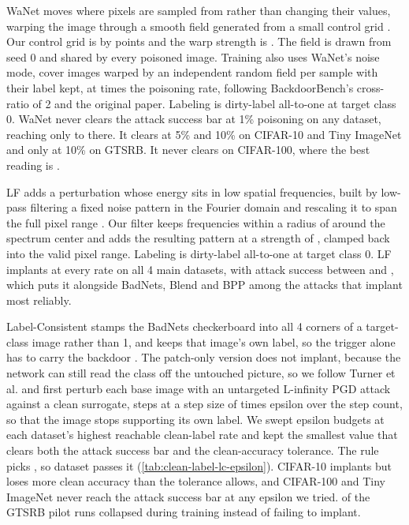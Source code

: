 WaNet moves where pixels are sampled from rather than changing their values, warping the image through a smooth field generated from a small control grid \cite{nguyen2021wanet}. Our control grid is \AttackWanetControlGridSize{} by \AttackWanetControlGridSize{} points and the warp strength is \AttackWanetStrength{}. The field is drawn from seed 0 and shared by every poisoned image. Training also uses WaNet's noise mode, cover images warped by an independent random field per sample with their label kept, at \AttackWanetCoverRatio{} times the poisoning rate, following BackdoorBench's cross-ratio of 2 and the original paper. Labeling is dirty-label all-to-one at target class 0. WaNet never clears the attack success bar at 1\% poisoning on any dataset, reaching only \AttackWanetAsrLowRateMin{} to \AttackWanetAsrLowRateMax{} there. It clears at 5\% and 10\% on CIFAR-10 and Tiny ImageNet and only at 10\% on GTSRB. It never clears on CIFAR-100, where the best reading is \AttackWanetAsrNeverClearingMax{}.

LF adds a perturbation whose energy sits in low spatial frequencies, built by low-pass filtering a fixed noise pattern in the Fourier domain and rescaling it to span the full pixel range \cite{zeng2021lf}. Our filter keeps frequencies within a radius of \AttackLfCutoff{} around the spectrum center and adds the resulting pattern at a strength of \AttackLfStrength{}, clamped back into the valid pixel range. Labeling is dirty-label all-to-one at target class 0. LF implants at every rate on all 4 main datasets, with attack success between \AttackLfAsrMin{} and \AttackLfAsrMax{}, which puts it alongside BadNets, Blend and BPP among the attacks that implant most reliably.

Label-Consistent stamps the BadNets checkerboard into all 4 corners of a target-class image rather than 1, and keeps that image's own label, so the trigger alone has to carry the backdoor \cite{turner2019label}. The patch-only version does not implant, because the network can still read the class off the untouched picture, so we follow Turner et al. and first perturb each base image with an untargeted L-infinity PGD attack \cite{madry2018pgd} against a clean surrogate, \AttackLcPgdSteps{} steps at a step size of \AttackLcPgdStepFactor{} times epsilon over the step count, so that the image stops supporting its own label. We swept \LcEpsilonBudgets{} epsilon budgets at each dataset's highest reachable clean-label rate and kept the smallest value that clears both the attack success bar and the clean-accuracy tolerance. The rule picks \LcEpsilonChosen{}, so \LcDatasetsWithEpsilon{} dataset passes it (\cref{tab:clean-label-lc-epsilon}). CIFAR-10 implants but loses more clean accuracy than the tolerance allows, and CIFAR-100 and Tiny ImageNet never reach the attack success bar at any epsilon we tried. \LcGtsrbPilotDiverged{} of the \LcGtsrbPilotRuns{} GTSRB pilot runs collapsed during training instead of failing to implant.

